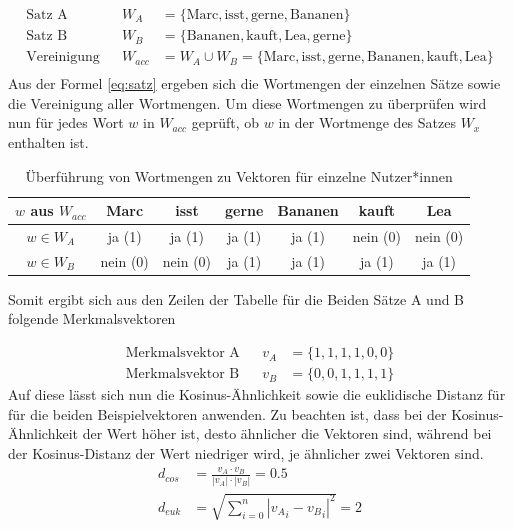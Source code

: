 \begin{equation}
	\begin{aligned} 
		\text{Satz A}&& W_{A}&=\{\text{Marc},\text{isst},\text{gerne},\text{Bananen}\}  \\
		\text{Satz B}&& W_{B}&=\{\text{Bananen},\text{kauft},\text{Lea},\text{gerne}\}  \\
		\text{Vereinigung}&& W_{acc} &= W_{A}\cup W_{B} = \{\text{Marc},\text{isst},\text{gerne},\text{Bananen},\text{kauft},\text{Lea}\}  \\
	\end{aligned} 
	\label{eq:satz}
\end{equation}
Aus der Formel \eqref{eq:satz} ergeben sich die Wortmengen der einzelnen Sätze sowie die Vereinigung aller Wortmengen. Um diese Wortmengen zu überprüfen wird nun für jedes Wort $w$ in $W_{acc}$ geprüft, ob $w$ in der Wortmenge des Satzes $W_{x}$ enthalten ist. 
\begin{center}
	\begin{table}
	\begin{tabular}{c | c | c | c | c | c | c}
		
		$w$ aus $W_{acc}$ & Marc 	& isst 		& gerne 	& Bananen 	& kauft 	& Lea		\\
		\hline
		\hline
		$w\in {W}_{A}$ 	  & ja (1)	& ja (1)	& ja (1)	& ja (1)	& nein (0)	& nein (0)	\\
		\hline
		$w\in {W}_{B}$ 	  & nein (0)& nein (0)	& ja (1)	& ja (1)	& ja (1)	& ja (1)

	\end{tabular}
		\caption{Überführung von Wortmengen zu Vektoren für einzelne Nutzer*innen}
	\end{table}
\end{center}

Somit ergibt sich aus den Zeilen der Tabelle für die Beiden Sätze A und B folgende Merkmalsvektoren

\begin{equation}
	\begin{aligned} 
		\text{Merkmalsvektor A}&& v_{A}&=\{1,1,1,1,0,0\}  \\
		\text{Merkmalsvektor B}&& v_{B}&=\{0,0,1,1,1,1\}
	\end{aligned} 
\label{eq:merkmalsvektoren}
\end{equation}
Auf diese lässt sich nun die Kosinus-Ähnlichkeit sowie die euklidische Distanz für für die beiden Beispielvektoren anwenden. Zu beachten ist, dass bei der Kosinus-Ähnlichkeit der Wert höher ist, desto ähnlicher die Vektoren sind, während bei der Kosinus-Distanz der Wert niedriger wird, je ähnlicher zwei Vektoren sind. 
\begin{equation}
	\begin{aligned} 
		{d}_{cos}&=\frac{v_{A}\cdot v_{B}}{\left|v_{A}\right|\cdot \left|v_{B}\right|} = 0.5\\
		{d}_{euk}&=\sqrt{\sum _{i=0}^{n}{\left|{v_{A}}_{i}-{v_{B}}_{i}\right|}^{2}} = 2 \\  
	\end{aligned} 
	\label{eq:distance_res}
\end{equation}
